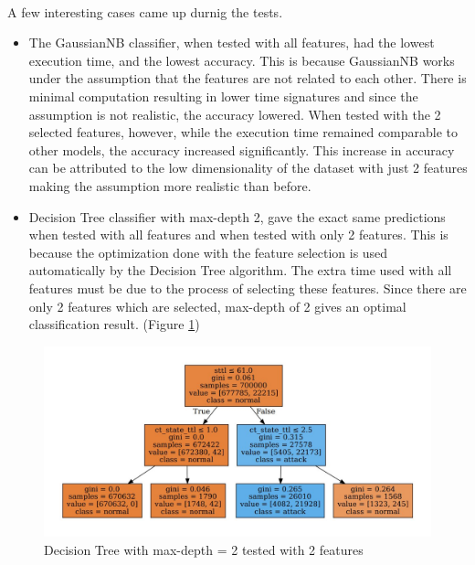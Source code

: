 \paragraph{}
A few interesting cases came up durnig the tests.
\begin{itemize}
    \item The GaussianNB classifier, when tested with all features, had the lowest execution time, and the lowest accuracy. This is because GaussianNB works under the assumption that the features are not related to each other. There is minimal computation resulting in lower time signatures and since the assumption is not realistic, the accuracy lowered. When tested with the 2 selected features, however, while the execution time remained comparable to other models, the accuracy increased significantly. This increase in accuracy can be attributed to the low dimensionality of the dataset with just 2 features making the assumption more realistic than before.
    \item Decision Tree classifier with max-depth 2, gave the exact same predictions when tested with all features and when tested with only 2 features. This is because the optimization done with the feature selection is used automatically by the Decision Tree algorithm. The extra time used with all features must be due to the process of selecting these features. Since there are only 2 features which are selected, max-depth of 2 gives an optimal classification result. (Figure \ref{dtc_md2_2_features})
\end{itemize}

\begin{figure}[h]
    \hfill\includegraphics[width=1\textwidth]{Chapter5/dtc_md2_2_features}\hspace*{\fill}
    \caption{Decision Tree with max-depth = 2 tested with 2 features}
    \label{dtc_md2_2_features}
\end{figure}

